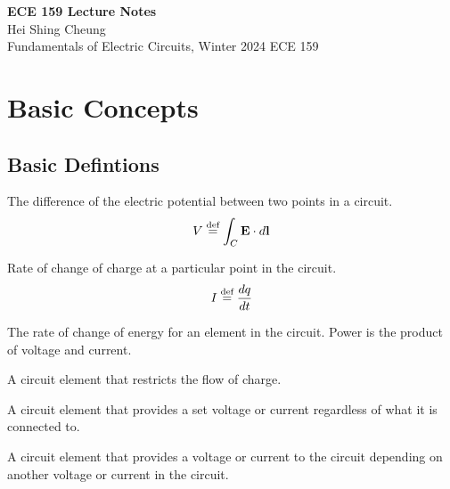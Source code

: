 \documentclass[11pt]{article}
\begin{document}
\thispagestyle{empty}
{\LARGE \bf ECE 159 Lecture Notes}\\
{\large Hei Shing Cheung}\\
Fundamentals of Electric Circuits, Winter 2024 \hfill ECE 159\\
\vspace{10pt}
\section{Basic Concepts}
\subsection{Basic Defintions}
\begin{definition}[Voltage]
    The difference of the electric potential between two points in a circuit.
    \begin{equation}
        V \stackrel{\text{def}}{=} \int_C \textbf{E} \cdot d\textbf{l}
    \end{equation}
    \end{definition}
    
    \begin{definition}[Current]
    Rate of change of charge at a particular point in the circuit.
    \begin{equation}
        I \stackrel{\text{def}}{=} \frac{dq}{dt}
    \end{equation}
    \end{definition}
    
    \begin{definition}[Power]
    The rate of change of energy for an element in the circuit. Power is the product of voltage and current.
    \end{definition}
    
    \begin{definition}[Resistors]
    A circuit element that restricts the flow of charge.
    \end{definition}
    
    \begin{definition}
    A circuit element that provides a set voltage or current regardless of what it is connected to.
    \end{definition}
    
    \begin{definition}
    A circuit element that provides a voltage or current to the circuit depending on another voltage or current in the circuit.
    \end{definition}
    
\end{document}
